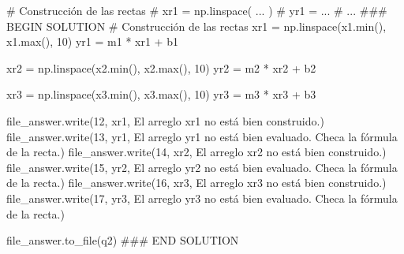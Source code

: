 \documentclass[
  letterpaper,
  DIV=11,
  numbers=noendperiod]{scrreprt}
\newenvironment{Shaded}{\begin{snugshade}}{\end{snugshade}}
\newcommand{\BuiltInTok}[1]{\textcolor[rgb]{0.00,0.23,0.31}{#1}}
\newcommand{\CommentTok}[1]{\textcolor[rgb]{0.37,0.37,0.37}{#1}}
\newcommand{\DecValTok}[1]{\textcolor[rgb]{0.68,0.00,0.00}{#1}}
\newcommand{\NormalTok}[1]{\textcolor[rgb]{0.00,0.23,0.31}{#1}}
\newcommand{\OperatorTok}[1]{\textcolor[rgb]{0.37,0.37,0.37}{#1}}
\newcommand{\RegionMarkerTok}[1]{\textcolor[rgb]{0.00,0.23,0.31}{#1}}
\newcommand{\StringTok}[1]{\textcolor[rgb]{0.13,0.47,0.30}{#1}}
\begin{document}
\begin{Shaded}
\begin{Highlighting}[]
\CommentTok{\# Construcción de las rectas}
\CommentTok{\# xr1 = np.linspace( ... )}
\CommentTok{\# yr1 = ...}
\CommentTok{\# ...}
\CommentTok{\#\#\# }\RegionMarkerTok{BEGIN}\CommentTok{ SOLUTION}
\CommentTok{\# Construcción de las rectas}
\NormalTok{xr1 }\OperatorTok{=}\NormalTok{ np.linspace(x1.}\BuiltInTok{min}\NormalTok{(), x1.}\BuiltInTok{max}\NormalTok{(), }\DecValTok{10}\NormalTok{)}
\NormalTok{yr1 }\OperatorTok{=}\NormalTok{ m1 }\OperatorTok{*}\NormalTok{ xr1 }\OperatorTok{+}\NormalTok{ b1}

\NormalTok{xr2 }\OperatorTok{=}\NormalTok{ np.linspace(x2.}\BuiltInTok{min}\NormalTok{(), x2.}\BuiltInTok{max}\NormalTok{(), }\DecValTok{10}\NormalTok{)}
\NormalTok{yr2 }\OperatorTok{=}\NormalTok{ m2 }\OperatorTok{*}\NormalTok{ xr2 }\OperatorTok{+}\NormalTok{ b2}

\NormalTok{xr3 }\OperatorTok{=}\NormalTok{ np.linspace(x3.}\BuiltInTok{min}\NormalTok{(), x3.}\BuiltInTok{max}\NormalTok{(), }\DecValTok{10}\NormalTok{)}
\NormalTok{yr3 }\OperatorTok{=}\NormalTok{ m3 }\OperatorTok{*}\NormalTok{ xr3 }\OperatorTok{+}\NormalTok{ b3}

\NormalTok{file\_answer.write(}\StringTok{\textquotesingle{}12\textquotesingle{}}\NormalTok{, xr1, }\StringTok{\textquotesingle{}El arreglo xr1 no está bien construido.\textquotesingle{}}\NormalTok{)}
\NormalTok{file\_answer.write(}\StringTok{\textquotesingle{}13\textquotesingle{}}\NormalTok{, yr1, }\StringTok{\textquotesingle{}El arreglo yr1 no está bien evaluado. Checa la fórmula de la recta.\textquotesingle{}}\NormalTok{)}
\NormalTok{file\_answer.write(}\StringTok{\textquotesingle{}14\textquotesingle{}}\NormalTok{, xr2, }\StringTok{\textquotesingle{}El arreglo xr2 no está bien construido.\textquotesingle{}}\NormalTok{)}
\NormalTok{file\_answer.write(}\StringTok{\textquotesingle{}15\textquotesingle{}}\NormalTok{, yr2, }\StringTok{\textquotesingle{}El arreglo yr2 no está bien evaluado. Checa la fórmula de la recta.\textquotesingle{}}\NormalTok{)}
\NormalTok{file\_answer.write(}\StringTok{\textquotesingle{}16\textquotesingle{}}\NormalTok{, xr3, }\StringTok{\textquotesingle{}El arreglo xr3 no está bien construido.\textquotesingle{}}\NormalTok{)}
\NormalTok{file\_answer.write(}\StringTok{\textquotesingle{}17\textquotesingle{}}\NormalTok{, yr3, }\StringTok{\textquotesingle{}El arreglo yr3 no está bien evaluado. Checa la fórmula de la recta.\textquotesingle{}}\NormalTok{)}

\NormalTok{file\_answer.to\_file(}\StringTok{\textquotesingle{}q2\textquotesingle{}}\NormalTok{)}
\CommentTok{\#\#\# }\RegionMarkerTok{END}\CommentTok{ SOLUTION}
\end{Highlighting}
\end{Shaded}
\end{document}
